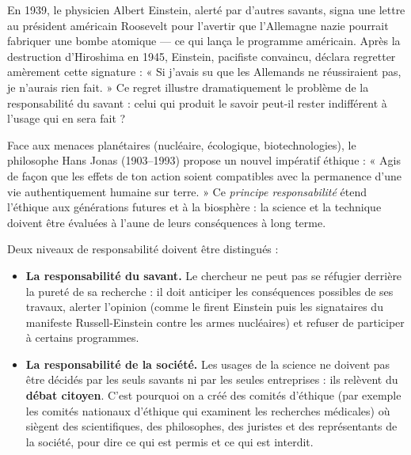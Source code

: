 \documentclass[11pt]{article}
\newcommand{\cle}[1]{{\popxbold\color{popdark}#1}}
\begin{document}
\begin{savaistu}
En 1939, le physicien Albert Einstein, alerté par d'autres savants, signa une lettre au président américain Roosevelt pour l'avertir que l'Allemagne nazie pourrait fabriquer une bombe atomique — ce qui lança le programme américain. Après la destruction d'Hiroshima en 1945, Einstein, pacifiste convaincu, déclara regretter amèrement cette signature : « Si j'avais su que les Allemands ne réussiraient pas, je n'aurais rien fait. » Ce regret illustre dramatiquement le problème de la responsabilité du savant : celui qui produit le savoir peut-il rester indifférent à l'usage qui en sera fait ?
\end{savaistu}

\begin{savaistu}
Face aux menaces planétaires (nucléaire, écologique, biotechnologies), le philosophe Hans Jonas (1903--1993) propose un nouvel impératif éthique : « Agis de façon que les effets de ton action soient compatibles avec la permanence d'une vie authentiquement humaine sur terre. » Ce \emph{principe responsabilité} étend l'éthique aux générations futures et à la biosphère : la science et la technique doivent être évaluées à l'aune de leurs conséquences à long terme.
\end{savaistu}

Deux niveaux de responsabilité doivent être distingués :

\begin{itemize}
\item \textbf{La responsabilité du savant.} Le chercheur ne peut pas se réfugier derrière la pureté de sa recherche : il doit anticiper les conséquences possibles de ses travaux, alerter l'opinion (comme le firent Einstein puis les signataires du manifeste Russell-Einstein contre les armes nucléaires) et refuser de participer à certains programmes.
\item \textbf{La responsabilité de la société.} Les usages de la science ne doivent pas être décidés par les seuls savants ni par les seules entreprises : ils relèvent du \textbf{débat citoyen}. C'est pourquoi on a créé des \cle{comités d'éthique} (par exemple les comités nationaux d'éthique qui examinent les recherches médicales) où siègent des scientifiques, des philosophes, des juristes et des représentants de la société, pour dire ce qui est permis et ce qui est interdit.
\end{itemize}
\end{document}
